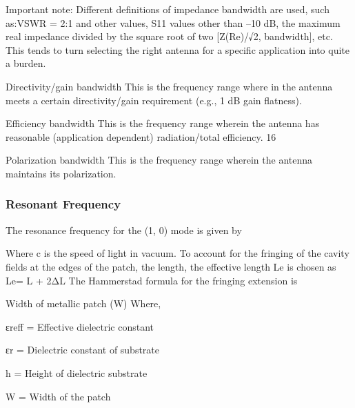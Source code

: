 \documentclass[12pt]{article}
\begin{document}
                Important note: Different definitions of impedance bandwidth are used, such as:VSWR = 2:1 and other values, S11 values other than –10 dB, the maximum real impedance divided by the square root of two [Z(Re)/√2, bandwidth], etc. This tends to turn selecting the right antenna for a specific application into quite a burden.
				\item
                Directivity/gain bandwidth
                This is the frequency range where in the antenna meets a certain directivity/gain
                requirement (e.g., 1 dB gain flatness).
                \item 
                Efficiency bandwidth
                This is the frequency range wherein the antenna has reasonable (application dependent)
                radiation/total efficiency.
                16
                \item
                Polarization bandwidth
                This is the frequency range wherein the antenna maintains its polarization.

              \subsubsection{Resonant Frequency}\label{sub:Resonant Frequency}
               \justify
	              The resonance frequency for the (1, 0) mode is given by
	                               
	                      Where c is the speed of light in vacuum. To account for the fringing of the cavity fields at the edges of the patch, the length, the effective length Le is chosen as
	                                        Le= L + 2ΔL                                                  
	                      The Hammerstad formula for the fringing extension is
	
	                                
	                      Width of metallic patch (W)
	                      Where,
	                      \item
	                        εreff = Effective dielectric constant
                          \item
	                        εr = Dielectric constant of substrate
	                      \item
	                        h = Height of dielectric substrate
                           \item
	                        W = Width of the patch
\end{document}
